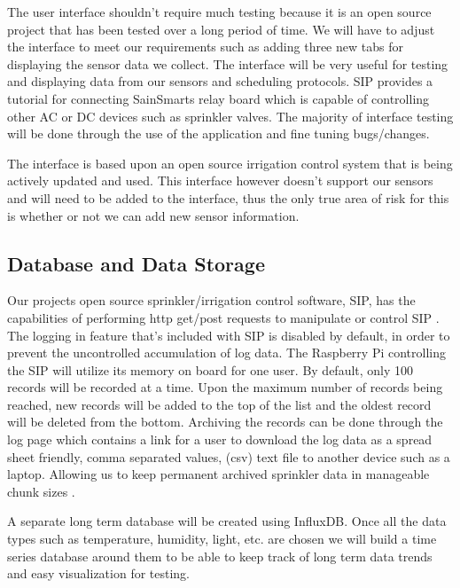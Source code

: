 \documentclass[letterpaper, 10 pt, conference]{ieeeconf}  %
\begin{document}
The user interface shouldn't require much testing because it is an open source project that has been tested over a long period of time. We will have to adjust the interface to meet our requirements such as adding three new tabs for displaying the sensor data we collect. The interface will be very useful for testing and displaying data from our sensors and scheduling protocols. SIP provides a tutorial for connecting SainSmarts relay board which is capable of controlling other AC or DC devices such as sprinkler valves. The majority of interface testing will be done through the use of the application and fine tuning bugs/changes.

The interface is based upon an open source irrigation control system that is being actively updated and used. This interface however doesn't support our sensors and will need to be added to the interface, thus the only true area of risk for this is whether or not we can add new sensor information.


\subsection{Database and Data Storage}
Our projects open source sprinkler/irrigation control software, SIP, has the capabilities of performing http get/post requests to manipulate or control SIP \cite{SIP}. The logging in feature that's included with SIP is disabled by default, in order to prevent the uncontrolled accumulation of log data. The Raspberry Pi controlling the SIP will utilize its memory on board for one user. By default, only 100 records will be recorded at a time. Upon the maximum number of records being reached, new records will be added to the top of the list and the oldest record will be deleted from the bottom. Archiving the records can be done through the log page which contains a link for a user to download the log data as a spread sheet friendly, comma separated values, (csv) text file to another device such as a laptop. Allowing us to keep permanent archived sprinkler data in manageable chunk sizes \cite{SIP}.

A separate long term database will be created using InfluxDB. Once all the data types such as temperature, humidity, light, etc. are chosen we will build a time series database around them to be able to keep track of long term data trends and easy visualization for testing.
\end{document}
